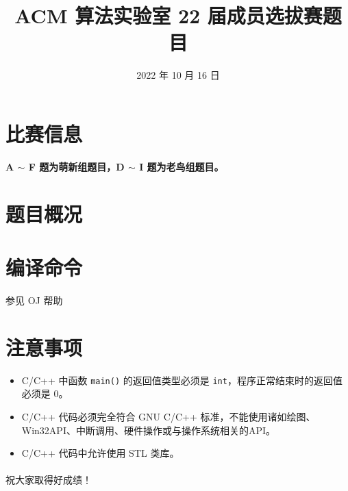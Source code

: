 \documentclass{../cpct/ctpro}
\title{ACM 算法实验室 22 届成员选拔赛题目}
\date{2022 年 10 月 16 日}
\begin{document}
\maketitle
{}


\section*{比赛信息}

\begin{remark}
    \textbf{A $\sim$ F 题为萌新组题目，D $\sim$ I 题为老鸟组题目。}
\end{remark}


\section*{题目概况}

\problemtab

\section*{编译命令}

参见 OJ 帮助

\section*{注意事项}

\begin{itemize}
    \item C/C++ 中函数 \lstinline{main()} 的返回值类型必须是 \lstinline{int}，程序正常结束时的返回值必须是 $0$。
    \item C/C++ 代码必须完全符合 GNU C/C++ 标准，不能使用诸如绘图、Win32API、中断调用、硬件操作或与操作系统相关的API。
    \item C/C++ 代码中允许使用 STL 类库。
\end{itemize}

\paragraph*{} 祝大家取得好成绩！
\end{document}
